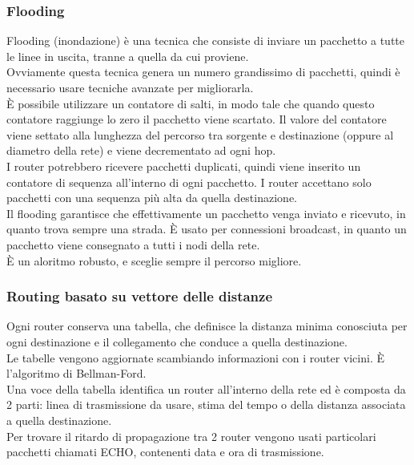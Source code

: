 \documentclass{article}
\begin{document}
\subsubsection{Flooding}
Flooding (inondazione) è una tecnica che consiste di inviare un pacchetto a tutte le linee in uscita, tranne a quella da cui proviene. \\
Ovviamente questa tecnica genera un numero grandissimo di pacchetti, quindi è necessario usare tecniche avanzate per migliorarla.\\
È possibile utilizzare un contatore di salti, in modo tale che quando questo contatore raggiunge lo zero il pacchetto viene scartato. Il valore del contatore viene settato alla lunghezza del percorso tra sorgente e destinazione (oppure al diametro della rete) e viene decrementato ad ogni hop.\\
I router potrebbero ricevere pacchetti duplicati, quindi viene inserito un contatore di sequenza all'interno di ogni pacchetto. I router accettano solo pacchetti con una sequenza più alta da quella destinazione.\\
Il flooding garantisce che effettivamente un pacchetto venga inviato e ricevuto, in quanto trova sempre una strada. È usato per connessioni broadcast, in quanto un pacchetto viene consegnato a tutti i nodi della rete. \\
È un aloritmo robusto, e sceglie sempre il percorso migliore.
\subsubsection{Routing basato su vettore delle distanze}
Ogni router conserva una tabella, che definisce la distanza minima conosciuta per ogni destinazione e il collegamento che conduce a quella destinazione.\\
Le tabelle vengono aggiornate scambiando informazioni con i router vicini. È l'algoritmo di Bellman-Ford.\\
Una voce della tabella identifica un router all'interno della rete ed è composta da 2 parti: linea di trasmissione da usare, stima del tempo o della distanza associata a quella destinazione.\\
Per trovare il ritardo di propagazione tra 2 router vengono usati particolari pacchetti chiamati ECHO, contenenti data e ora di trasmissione.
\end{document}
